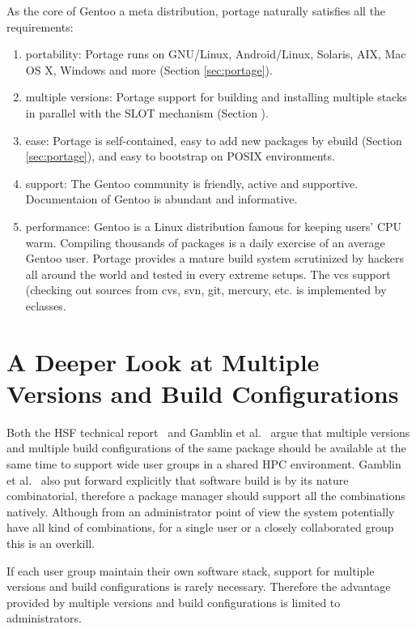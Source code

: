 \documentclass[a4paper,conference]{IEEEtran}
\begin{document}
As the core of Gentoo a meta distribution, portage naturally satisfies
all the requirements:

\begin{enumerate}
\item portability: Portage runs on GNU/Linux, Android/Linux, Solaris,
  AIX, Mac OS X, Windows and more (Section \ref{sec:portage}).
\item multiple versions: Portage support for building and installing
  multiple stacks in parallel with the SLOT mechanism
  (Section \label{sec:ebuild}).
\item ease: Portage is self-contained, easy to add new packages by
  ebuild (Section \ref{sec:portage}), and easy to bootstrap on POSIX
  environments. 
\item support: The Gentoo community is friendly, active and
  supportive.  Documentaion of Gentoo is abundant and informative.
\item performance: Gentoo is a Linux distribution famous for keeping
  users' CPU warm.  Compiling thousands of packages is a daily
  exercise of an average Gentoo user.  Portage provides a mature build
  system scrutinized by hackers all around the world and tested in
  every extreme setups. The vcs support (checking out sources from
  cvs, svn, git, mercury, etc. is implemented by eclasses.
\end{enumerate}

\section{A Deeper Look at Multiple Versions and Build Configurations}
Both the HSF technical report~\cite{hsf:package} and Gamblin et
al.~\cite{spack} argue that multiple versions and multiple build
configurations of the same package should be available at the same
time to support wide user groups in a shared HPC environment.  Gamblin
et al.~\cite{spack} also put forward explicitly that software build is
by its nature combinatorial, therefore a package manager should
support all the combinations natively.  Although from an administrator
point of view the system potentially have all kind of combinations,
for a single user or a closely collaborated group this is an overkill.

If each user group maintain their own software stack, support for
multiple versions and build configurations is rarely necessary.
Therefore the advantage provided by multiple versions and build
configurations is limited to administrators.
\end{document}
